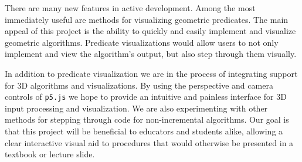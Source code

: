 \documentclass[a4paper,UKenglish]{lipics-v2016}
\begin{document}
  There are many new features in active development.
  Among the most immediately useful are methods for visualizing geometric predicates.
	The main appeal of this project is the ability to quickly and easily implement and visualize geometric algorithms.
  Predicate visualizations would allow users to not only implement and view the algorithm's output, but also step through them visually.

  In addition to predicate visualization we are in the process of integrating support for 3D algorithms and visualizations.
	By using the perspective and camera controls of \texttt{p5.js} we hope to provide an intuitive and painless interface for 3D input processing and visualization.
  We are also experimenting with other methods for stepping through code for non-incremental algorithms.
  Our goal is that this project will be beneficial to educators and students alike, allowing a clear interactive visual aid to procedures that would otherwise be presented in a textbook or lecture slide.






% 



\end{document}
